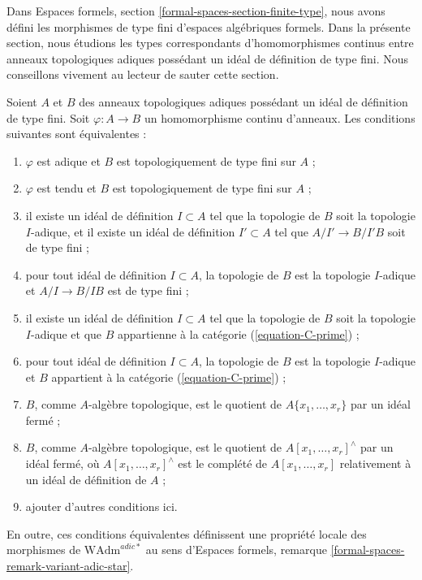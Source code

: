 \noindent
Dans Espaces formels, section \ref{formal-spaces-section-finite-type}, nous
avons défini les morphismes de type fini d'espaces algébriques formels. Dans la
présente section, nous étudions les types correspondants d'homomorphismes
continus entre anneaux topologiques adiques possédant un idéal de définition
de type fini. Nous conseillons vivement au lecteur de sauter cette section.

\begin{lemma}
\label{lemma-finite-type}
Soient $A$ et $B$ des anneaux topologiques adiques possédant un idéal de
définition de type fini. Soit $\varphi : A \to B$ un homomorphisme continu
d'anneaux. Les conditions suivantes sont équivalentes :
\begin{enumerate}
\item $\varphi$ est adique et $B$ est topologiquement de type fini sur $A$ ;
\item $\varphi$ est tendu et $B$ est topologiquement de type fini sur $A$ ;
\item il existe un idéal de définition $I \subset A$ tel que la topologie de
$B$ soit la topologie $I$-adique, et il existe un idéal de définition
$I' \subset A$ tel que $A/I' \to B/I'B$ soit de type fini ;
\item pour tout idéal de définition $I \subset A$, la topologie de $B$ est la
topologie $I$-adique et $A/I \to B/IB$ est de type fini ;
\item il existe un idéal de définition $I \subset A$ tel que la topologie de
$B$ soit la topologie $I$-adique et que $B$ appartienne à la catégorie
(\ref{equation-C-prime}) ;
\item pour tout idéal de définition $I \subset A$, la topologie de $B$ est la
topologie $I$-adique et $B$ appartient à la catégorie
(\ref{equation-C-prime}) ;
\item $B$, comme $A$-algèbre topologique, est le quotient de
$A\{x_1, \ldots, x_r\}$ par un idéal fermé ;
\item $B$, comme $A$-algèbre topologique, est le quotient de
$A[x_1, \ldots, x_r]^\wedge$ par un idéal fermé, où
$A[x_1, \ldots, x_r]^\wedge$ est le complété de
$A[x_1, \ldots, x_r]$ relativement à un idéal de définition de $A$ ;
\item ajouter d'autres conditions ici.
\end{enumerate}
En outre, ces conditions équivalentes définissent une propriété locale des
morphismes de $\text{WAdm}^{adic*}$ au sens d'Espaces formels, remarque
\ref{formal-spaces-remark-variant-adic-star}.
\end{lemma}

